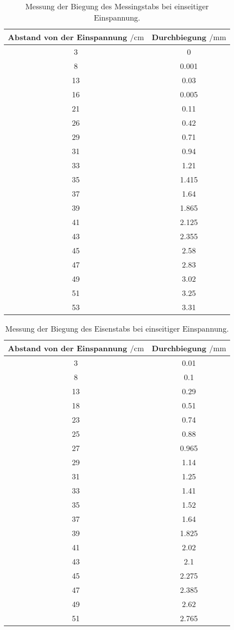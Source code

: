  \begin{table}
    \centering
    \caption{Messung der Biegung des Messingstabs bei einseitiger Einspannung.}
    \label{tab:eck}
    \begin{tabular}{c c}
      \toprule
      Abstand von der Einspannung $\mathbin{/} \si{\centi\m}$ & Durchbiegung $\mathbin{/} \si{\milli\m}$\\
      \midrule
      3  & 0\\
      8  & 0.001\\
      13 & 0.03\\
      16 & 0.005\\
      21 & 0.11\\
      26 & 0.42\\
      29 & 0.71\\
      31 & 0.94\\
      33 & 1.21\\
      35 & 1.415\\
      37 & 1.64\\
      39 & 1.865\\
      41 & 2.125\\
      43 & 2.355\\
      45 & 2.58\\
      47 & 2.83\\
      49 & 3.02\\
      51 & 3.25\\
      53 & 3.31\\
      \bottomrule
    \end{tabular}
  \end{table}

  \begin{table}
    \centering
    \caption{Messung der Biegung des Eisenstabs bei einseitiger Einspannung.}
    \label{tab:rund}
    \begin{tabular}{c c}
      \toprule
      Abstand von der Einspannung $\mathbin{/} \si{\centi\m}$ & Durchbiegung $\mathbin{/} \si{\milli\m}$\\
      \midrule
      3  & 0.01\\
      8  & 0.1\\
      13 & 0.29\\
      18 & 0.51\\
      23 & 0.74\\
      25 & 0.88\\
      27 & 0.965\\
      29 & 1.14\\
      31 & 1.25\\
      33 & 1.41\\
      35 & 1.52\\
      37 & 1.64\\
      39 & 1.825\\
      41 & 2.02\\
      43 & 2.1\\
      45 & 2.275\\
      47 & 2.385\\
      49 & 2.62\\
      51 & 2.765\\
      \bottomrule
    \end{tabular}
  \end{table}
  \FloatBarrier

